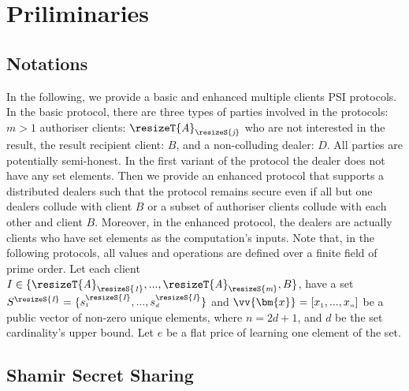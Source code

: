 
\section{Priliminaries}

\subsection{Notations}
In the following, we  provide a basic and enhanced multiple clients PSI protocols. In the basic protocol, there are three types of parties involved in the protocols: $m>1$ authoriser clients: $\resizeT {\textit A}_{\resizeS {\textit  j}}$ who are not interested in the result, the result recipient client: $B$, and a non-colluding dealer: $D$. All parties are potentially semi-honest. In the first variant of the protocol the dealer does not have any set elements. Then we provide an enhanced protocol   that supports a distributed dealers such that the protocol remains secure even if  all but one dealers collude with client $B$ or  a subset of authoriser clients collude with each other and client $B$. Moreover, in the enhanced protocol, the dealers are actually clients who have  set elements as the computation's inputs.  Note that, in the following protocols, all  values and operations are defined over a finite field of prime order. Let each client $I\in \{\resizeT {\textit A}_{\resizeS {\textit  1}},...,\resizeT {\textit A}_{\resizeS {\textit  m}},B\}$, have a set $S^{\resizeS {\textit I} }=\{s^{\resizeS {\textit I} }_{\scriptscriptstyle 1},..., s^{\resizeS {\textit I} }_{\scriptscriptstyle d}\}$ and   $\vv{\bm{x}}=[x_{\scriptscriptstyle 1},..., x_{\scriptscriptstyle n}]$ be a  public vector of non-zero unique elements, where $n=2d+1$, and $d$ be the set cardinality's upper bound. Let $e$ be a flat price of learning one element of the set.   

\subsection{Shamir Secret Sharing}

